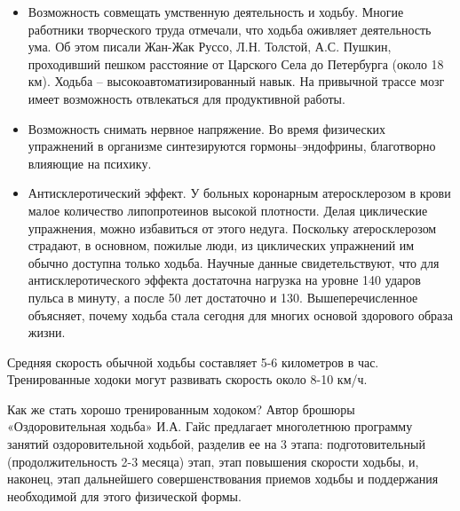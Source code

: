 \documentclass[14pt, a4paper]{article}
\begin{document}
\begin{itemize}
        \item Возможность совмещать умственную деятельность и ходьбу. Многие работники творческого труда  отмечали, что ходьба оживляет деятельность ума. Об этом писали Жан-Жак Руссо, Л.Н. Толстой, А.С. Пушкин, проходивший пешком расстояние от Царского Села до Петербурга (около 18  км).  Ходьба –  высокоавтоматизированный навык. На привычной трассе мозг имеет возможность отвлекаться для продуктивной работы.
        
        \item Возможность снимать нервное напряжение. Во время физических упражнений в организме синтезируются гормоны–эндофрины, благотворно влияющие на психику.
        
        \item Антисклеротический эффект. У больных коронарным атеросклерозом в крови малое количество липопротеинов высокой плотности. Делая циклические упражнения, можно избавиться от этого недуга. Поскольку атеросклерозом страдают, в основном, пожилые люди, из циклических упражнений им обычно доступна только ходьба. Научные данные свидетельствуют, что для антисклеротического эффекта достаточна нагрузка на уровне 140 ударов пульса в минуту, а после 50 лет достаточно и 130. Вышеперечисленное объясняет, почему ходьба стала сегодня для многих основой здорового образа жизни.
    \end{itemize}

    Средняя скорость обычной ходьбы составляет 5-6 километров в час. Тренированные ходоки могут развивать скорость около 8-10 км/ч.

    Как же стать хорошо тренированным ходоком? Автор брошюры «Оздоровительная ходьба» И.А. Гайс предлагает многолетнюю программу занятий оздоровительной ходьбой, разделив ее на 3 этапа: подготовительный (продолжительность 2-3 месяца) этап, этап повышения скорости ходьбы, и, наконец, этап дальнейшего совершенствования приемов ходьбы и поддержания необходимой для этого физической  формы.
\end{document}
